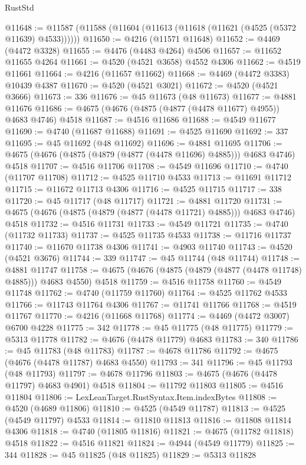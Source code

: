 \begin{lexlean}{RustStd}
\begin{coremodule}
@11648 := @11587 (@11588 (@11604 (@11613 (@11618 (@11621 (@4525 (@5372 @11639) @4533))))))
@11650 := @4216 (@11571 @11648)
@11652 := @4469 (@4472 @3328)
@11655 := @4476 (@4483 @4264) @4506
@11657 := @11652 @11655 @4264
@11661 := @4520 (@4521 @3658) @4552 @4306
@11662 := @4519 @11661
@11664 := @4216 (@11657 @11662)
@11668 := @4469 (@4472 @3383) @10439 @4387
@11670 := @4520 (@4521 @3021)
@11672 := @4520 (@4521 @3666)
@11673 := 336
@11676 := @45 @11673 (@48 @11673)
@11677 := @4881 @11676
@11686 := @4675 (@4676 (@4875 (@4877 (@4478 @11677) @4955)) @4683 @4746) @4518
@11687 := @4516 @11686
@11688 := @4549 @11677
@11690 := @4740 (@11687 @11688)
@11691 := @4525 @11690
@11692 := 337
@11695 := @45 @11692 (@48 @11692)
@11696 := @4881 @11695
@11706 := @4675 (@4676 (@4875 (@4879 (@4877 (@4478 @11696) @4885))) @4683 @4746) @4518
@11707 := @4516 @11706
@11708 := @4549 @11696
@11710 := @4740 (@11707 @11708)
@11712 := @4525 @11710 @4533
@11713 := @11691 @11712
@11715 := @11672 @11713 @4306
@11716 := @4525 @11715
@11717 := 338
@11720 := @45 @11717 (@48 @11717)
@11721 := @4881 @11720
@11731 := @4675 (@4676 (@4875 (@4879 (@4877 (@4478 @11721) @4885))) @4683 @4746) @4518
@11732 := @4516 @11731
@11733 := @4549 @11721
@11735 := @4740 (@11732 @11733)
@11737 := @4525 @11735 @4533
@11738 := @11716 @11737
@11740 := @11670 @11738 @4306
@11741 := @4903 @11740
@11743 := @4520 (@4521 @3676)
@11744 := 339
@11747 := @45 @11744 (@48 @11744)
@11748 := @4881 @11747
@11758 := @4675 (@4676 (@4875 (@4879 (@4877 (@4478 @11748) @4885))) @4683 @4550) @4518
@11759 := @4516 @11758
@11760 := @4549 @11748
@11762 := @4740 (@11759 @11760)
@11764 := @4525 @11762 @4533
@11766 := @11743 @11764 @4306
@11767 := @11741 @11766
@11768 := @4519 @11767
@11770 := @4216 (@11668 @11768)
@11774 := @4469 (@4472 @3007) @6700 @4228
@11775 := 342
@11778 := @45 @11775 (@48 @11775)
@11779 := @5313 @11778
@11782 := @4676 (@4478 @11779) @4683
@11783 := 340
@11786 := @45 @11783 (@48 @11783)
@11787 := @4678 @11786
@11792 := @4675 (@4676 (@4478 @11787) @4683 @4550)
@11793 := 341
@11796 := @45 @11793 (@48 @11793)
@11797 := @4678 @11796
@11803 := @4675 (@4676 (@4478 @11797) @4683 @4901) @4518
@11804 := @11792 @11803
@11805 := @4516 @11804
@11806 := LexLeanTarget.RustSyntax.Item.indexBytes
@11808 := @4520 (@4689 @11806)
@11810 := @4525 (@4549 @11787)
@11813 := @4525 (@4549 @11797) @4533
@11814 := @11810 @11813
@11816 := @11808 @11814 @4306
@11818 := @4740 (@11805 @11816)
@11821 := @4675 (@11782 @11818) @4518
@11822 := @4516 @11821
@11824 := @4944 (@4549 @11779)
@11825 := 344
@11828 := @45 @11825 (@48 @11825)
@11829 := @5313 @11828

\end{coremodule}
\end{lexlean}

